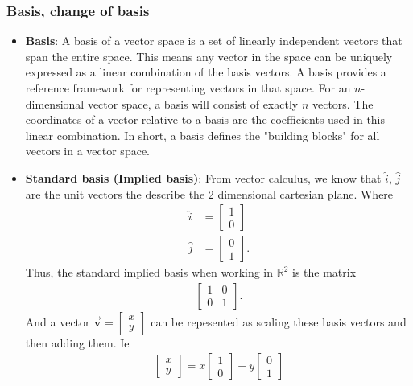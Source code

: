 \documentclass{report}
\begin{document}
    \pagebreak 
    \subsubsection{Basis, change of basis}
    \begin{itemize}
        \item \textbf{Basis}: A basis of a vector space is a set of linearly independent vectors that span the entire space. This means any vector in the space can be uniquely expressed as a linear combination of the basis vectors. A basis provides a reference framework for representing vectors in that space.
            \bigbreak \noindent 
            For an $n$-dimensional vector space, a basis will consist of exactly $n$ vectors. The coordinates of a vector relative to a basis are the coefficients used in this linear combination.
            \bigbreak \noindent 
            In short, a basis defines the "building blocks" for all vectors in a vector space.
        \item \textbf{Standard basis (Implied basis)}: From vector calculus, we know that $\hat{i}$, $\hat{j}$ are the unit vectors the describe the 2 dimensional cartesian plane. Where
            \begin{align*}
                \hat{i} &= \begin{bmatrix} 1 \\ 0 \end{bmatrix} \\
                \hat{j} &= \begin{bmatrix} 0 \\ 1 \end{bmatrix}
            .\end{align*}
            Thus, the standard implied basis when working in $\mathbb{R}^{2}$ is the matrix
            \begin{align*}
                \begin{bmatrix} 1 & 0 \\ 0 & 1\end{bmatrix}
            .\end{align*}
            And a vector $\vec{\mathbf{v}} = \begin{bmatrix} x \\ y \end{bmatrix} $ can be repesented as scaling these basis vectors and then adding them. Ie
            \begin{align*}
                \begin{bmatrix} x \\ y \end{bmatrix} = x \begin{bmatrix} 1 \\ 0\end{bmatrix} + y \begin{bmatrix} 0 \\ 1 \end{bmatrix}

\end{align*}
\end{itemize}
\end{document}
